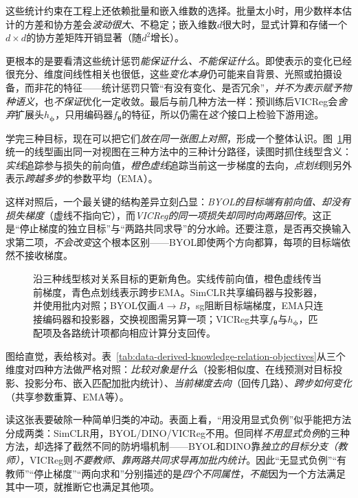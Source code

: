 这些统计约束在工程上还依赖批量和嵌入维数的选择。批量太小时，用少数样本估计的方差和协方差会\emph{波动很大}、不稳定；嵌入维数$d$很大时，显式计算和存储一个$d\times d$的协方差矩阵开销显著（随$d^2$增长）。

更根本的是要看清这些统计惩罚\emph{能保证什么、不能保证什么}。即使表示的变化已经很充分、维度间线性相关也很低，这些\emph{变化本身}仍可能来自背景、光照或拍摄设备，而非花的特征——统计惩罚只管“有没有变化、是否冗余”，\emph{并不为表示赋予物种语义}，也\emph{不保证}优化一定收敛。最后与前几种方法一样：预训练后VICReg会\emph{舍弃}扩展头$h_{\bm{\phi}}$，只用编码器$f_{\bm{\theta}}$的特征，所以仍需在\emph{这个}接口上检验下游用途。

学完三种目标，现在可以把它们\emph{放在同一张图上对照}，形成一个整体认识。图~\ref{fig:data-derived-knowledge-relation-objectives}用统一的线型画出同一对视图在三种方法中的三种计分路径，读图时抓住线型含义：\emph{实线}追踪参与损失的前向值，\emph{橙色虚线}追踪当前这一步梯度的去向，\emph{点划线}则另外表示\emph{跨越多步}的参数平均（EMA）。

这样对照后，一个最关键的结构差异立刻凸显：\emph{BYOL的目标端有前向值、却没有损失梯度}（虚线不指向它），而\emph{VICReg的同一项损失却同时向两路回传}。这正是“停止梯度的独立目标”与“两路共同求导”的分水岭。还要注意，是否再交换输入求第二项，\emph{不会改变}这个根本区别——BYOL即使两个方向都算，每项的目标端依然不接收梯度。

\begin{figure}[htbp]
  \centering
  
  \caption{沿三种线型核对关系目标的更新角色。实线传前向值，橙色虚线传当前梯度，青色点划线表示跨步EMA。SimCLR共享编码器与投影器，并使用批内对照；BYOL仅画$A\to B$，sg阻断目标端梯度，EMA只连接编码器和投影器，交换视图需另算一项；VICReg共享$f_{\bm{\theta}}$与$h_{\bm{\phi}}$，匹配项及各路统计项都向相应计算分支回传。}
  \label{fig:data-derived-knowledge-relation-objectives}
\end{figure}
\FloatBarrier

图给直觉，表给核对。表~\ref{tab:data-derived-knowledge-relation-objectives}从三个维度对四种方法做严格对照：\emph{比较对象是什么}（投影相似度、在线预测对目标投影、投影分布、嵌入匹配加批内统计）、\emph{当前梯度去向}（回传几路）、\emph{跨步如何变化}（共享参数重算、EMA等）。

读这张表要破除一种简单归类的冲动。表面上看，“用没用显式负例”似乎能把方法分成两类：SimCLR用，BYOL/DINO/VICReg不用。但同样\emph{不用显式负例}的三种方法，却选择了截然不同的防坍塌机制——BYOL和DINO靠\emph{独立的目标分支（教师）}，VICReg则\emph{不要教师、靠两路共同求导再加批内统计}。因此“无显式负例”“有教师”“停止梯度”“两向求和”分别描述的是\emph{四个不同属性}，\emph{不能}因为一个方法满足其中一项，就推断它也满足其他项。

